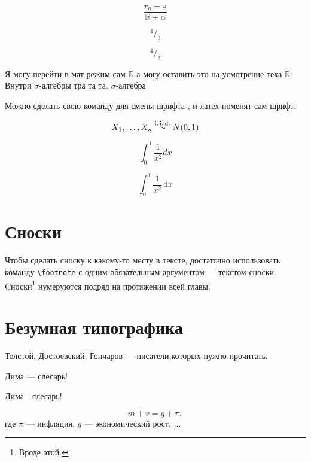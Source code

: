 \documentclass[12pt, a4paper]{article}
\def \a{\alpha}
\newcommand{\RR}{\ensuremath{\mathbb{R}}}
\newcommand{\s}{\ensuremath{\sigma}}
\newcommand{\newsize}[1]{ {\fontsize{32}{1.33}\selectfont #1 } }
\newcommand{\fr}[2]{ ^{#1}/_{#2} }
\newcommand{\iid}{\mathrel{\stackrel{\rm i.\,i.\,d.}\sim}}
\newcommand{\dx}[1]{\,\mathrm{d}#1} %
\begin{document}
\begin{equation*}
  \frac{r_n - \pi}{\RR + \a} 
\end{equation*}

$$
^4/_3
$$

$$
\fr{4}{3}
$$

Я могу перейти в мат режим сам $\RR$ а могу оставить это на усмотрение теха \RR. Внутри $\s$-алгебры тра та та. \s-алгебра

Можно сделать \newsize{свою команду для смены шрифта}, и латех поменят сам шрифт.

$$
X_1, \ldots, X_n \iid N(0, 1)
$$

$$
\int_0^1 \frac{1}{x^2} dx 
$$

$$
\int_0^1 \frac{1}{x^2} \dx{x}
$$


\section{Сноски}

Чтобы сделать сноску к какому-то месту в тексте, достаточно использовать команду \verb|\footnote| с одним обязательным аргументом — текстом сноски. Cноски\footnote{Вроде этой.} нумеруются подряд на протяжении всей главы.

\section{Безумная типографика}

Толстой, Достоевский, Гончаров --- писатели,которых нужно прочитать. 

\vspace{2cm}

Дима --- слесарь!  %

Дима - слесарь!    %

\vspace{2cm}

\begin{equation} 
    m + v = g + \pi,
\end{equation}
где $\pi$ --- инфляция, $g$ --- экономический рост, ... 


\end{document}
